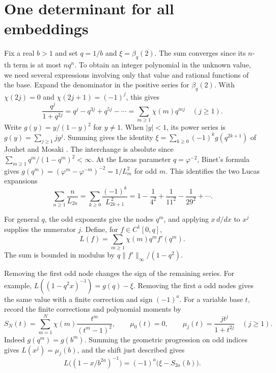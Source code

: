 \documentclass[11pt,letterpaper]{article}
\begin{document}
\section{One determinant for all embeddings}\label{sec:pencil}
Fix a real \(b>1\) and set \(q=1/b\) and \(\xi=\beta_q(2)\).
The sum converges since its \(n\)-th term is at most \(nq^n\).
To obtain an integer polynomial in the unknown value, we need several
expressions involving only that value and rational functions of the base.
Expand the denominator in the positive series for \(\beta_q(2)\). With
\(\chi(2j)=0\) and \(\chi(2j+1)=(-1)^j\), this gives
\[
 \frac{q^j}{1+q^{2j}}=q^j-q^{3j}+q^{5j}-\cdots
                      =\sum_{m\ge1}\chi(m)q^{mj}\quad(j\ge1).
\]
Write \(g(y)=y/(1-y)^2\) for \(y\ne1\). When \(|y|<1\), its power
series is \(g(y)=\sum_{j\ge1}j y^j\).
Summing gives the identity \(\xi=\sum_{k\ge0}(-1)^k g(q^{2k+1})\) of
Jouhet and Mosaki \cite[\S6.2]{jm}. The interchange is absolute since
\(\sum_{m\ge1}q^m/(1-q^m)^2<\infty\).
At the Lucas parameter \(q=\varphi^{-2}\), Binet's formula gives
\(g(q^m)=(\varphi^m-\varphi^{-m})^{-2}=1/L_m^2\) for odd \(m\).
This identifies the two Lucas expansions
\begin{equation}\label{eq:odd-squares}
 \sum_{n\ge1}\frac{n}{L_{2n}}
 =\sum_{k\ge0}\frac{(-1)^k}{L_{2k+1}^{\,2}}
 =1-\frac{1}{4^2}+\frac{1}{11^2}-\frac{1}{29^2}+\cdots .
\end{equation}

For general \(q\), the odd exponents give the nodes \(q^m\), and applying
\(x\,d/dx\) to \(x^j\) supplies the numerator \(j\). Define, for
\(f\in C^1[0,q]\),
\[
  L(f)=\sum_{m\ge1}\chi(m)q^m f'(q^m).
\]
The sum is bounded in modulus by \(q\|f'\|_\infty/(1-q^2)\).

Removing the first odd node changes the sign of the remaining series.
For example,
\(L((1-q^2x)^{-1})=g(q)-\xi\).
Removing the first \(a\) odd nodes gives the same value with a finite
correction and sign \((-1)^a\). For a variable base \(t\), record the
finite corrections and polynomial moments by
\begin{equation}\label{eq:moments}
 S_N(t)=\sum_{m=1}^N\chi(m)\frac{t^m}{(t^m-1)^2},\qquad
 \mu_0(t)=0,\qquad \mu_j(t)=\frac{jt^j}{1+t^{2j}}\quad(j\ge1).
\end{equation}
Indeed \(g(q^m)=g(b^m)\). Summing the geometric progression on odd
indices gives \(L(x^j)=\mu_j(b)\), and the shift just described gives
\[
 L\big((1-x/b^{2a})^{-1}\big)=(-1)^a\big(\xi-S_{2a}(b)\big).
\]
\end{document}
